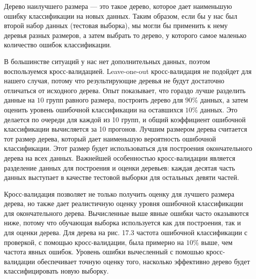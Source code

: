 Дерево наилучшего размера --- это такое дерево, которое дает наименьшую ошибку классификации на новых данных. Таким образом, если бы у нас был второй набор данных (тестовая выборка), мы могли бы применить к нему деревья разных размеров, а затем выбрать то дерево, у которого самое маленько количество ошибок классификации.

В большинстве ситуаций у нас нет дополнительных данных, поэтом воспользуемся кросс-валидацией. Leave-one-out кросс-валидация не подойдет для нашего случая, потому что результирующие деревья не будут достаточно отличаться от исходного дерева. Опыт показывает, что гораздо лучше разделить данные на $10$ групп равного размера, построить дерево для $90 \%$ данных, а затем оценить уровень ошибочной классификации на оставшихся $10 \%$ данных. Это делается по очереди для каждой из 10 групп, и общий коэффициент ошибочной классификации вычисляется за 10 прогонов. Лучшим размером дерева считается тот размер дерева, который дает наименьшую вероятность ошибочной классификации. Этот размер будет использоваться для построения окончательного дерева на всех данных. Важнейшей особенностью кросс-валидации является разделение данных для построения и оценки деревьев: каждая десятая часть данных выступает в качестве тестовой выборки для остальных девяти частей. 

Кросс-валидация позволяет не только получить оценку для лучшего размера дерева, но также дает реалистичную оценку уровня ошибочной классификации для окончательного дерева. Вычисленные выше явные ошибки часто оказывются ниже, потому что обучающая выборка используется как для построения, так и для оценки дерева. Для дерева на рис. 17.3 частота ошибочной классификации с проверкой, с помощью кросс-валидации, была примерно на $10 \%$ выше, чем частота явных ошибок. Уровень ошибки вычесленный с помошью кросс-валидации обеспечивает точную оценку того, насколько эффективно дерево будет классифицировать новую выборку.
